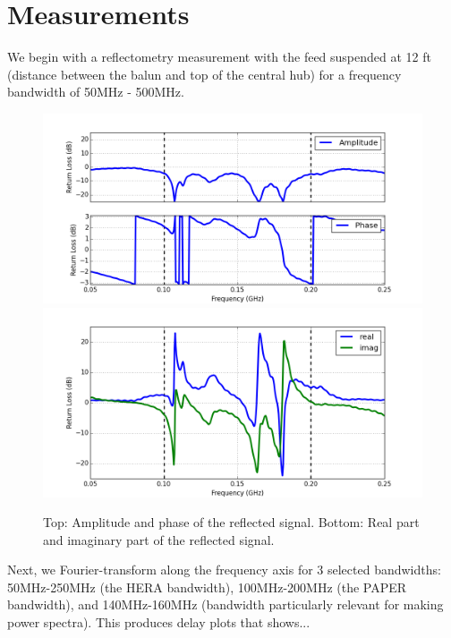 \documentclass[12pt,preprint]{aastex}
\begin{document}
\section{Measurements}

We begin with a reflectometry measurement with the feed suspended at 12 ft (distance between the balun and top of the central hub) for a frequency bandwidth of 50MHz - 500MHz.

\begin{figure}
\centering
\includegraphics[totalheight=0.4\textheight]{plots/frequency_amp_phase.png}
\includegraphics[totalheight=0.4\textheight]{plots/frequency_real_imag.png}
\caption{Top: Amplitude and phase of the reflected signal. Bottom: Real part and imaginary part of the reflected signal.}
\end{figure}

Next, we Fourier-transform along the frequency axis for 3 selected bandwidths: 50MHz-250MHz (the HERA bandwidth), 100MHz-200MHz (the PAPER bandwidth), and 140MHz-160MHz (bandwidth particularly relevant for making power spectra). This produces delay plots that shows...
\end{document}
